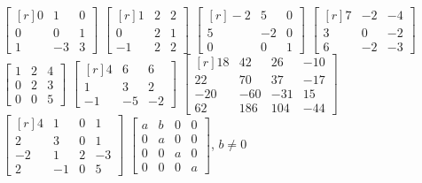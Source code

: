 \begin{tasks}[
    style=enumerate,
    label-offset = 3mm,
    ]
    \task $\begin{bmatrix*}[r]0 & 1 & 0 \\ 0 & 0 & 1 \\ 1 & -3 & 3\end{bmatrix*}$
    \task $\begin{bmatrix*}[r]1 & 2 & 2 \\ 0 & 2 & 1 \\ -1 & 2 & 2\end{bmatrix*}$
    \task $\begin{bmatrix*}[r]-2 & 5 & 0 \\ 5 & -2 & 0 \\ 0 & 0 & 1\end{bmatrix*}$
    \task $\begin{bmatrix*}[r]7 & -2 & -4 \\ 3 & 0 & -2 \\ 6 & -2 & -3\end{bmatrix*}$
    \task $\begin{bmatrix*}1 & 2 & 4 \\ 0 & 2 & 3 \\ 0 & 0 & 5\end{bmatrix*}$
    \task $\begin{bmatrix*}[r]4 & 6 & 6 \\ 1 & 3 & 2 \\ -1 & -5 & -2\end{bmatrix*}$
    \task $\begin{bmatrix*}[r]18 & 42 & 26 & -10 \\ 22 & 70 & 37 & -17 \\ -20 & -60 & -31 & 15 \\ 62 & 186 & 104 & -44\end{bmatrix*}$
    \task $\begin{bmatrix*}[r]4 & 1 & 0 & 1 \\ 2 & 3 & 0 & 1 \\ -2 & 1 & 2 & -3 \\ 2 & -1 & 0 & 5\end{bmatrix*}$
    \task $\begin{bmatrix*}a & b & 0 & 0 \\ 0 & a & 0 & 0 \\ 0 & 0 & a & 0 \\ 0 & 0 & 0 & a\end{bmatrix*}$, $b \neq 0$

\end{tasks}
